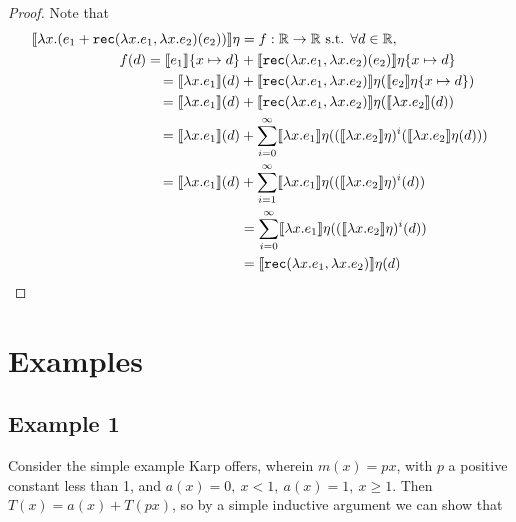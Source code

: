  \begin{proof}
 Note that
 \begin{align*}
 \llbracket \lambda x.(e_1 + \texttt{rec}(\lambda x.e_1, \lambda x.e_2)(e_2)) \rrbracket \eta
 &= f : \mathbb{R} \rightarrow \mathbb{R} \text{ s.t. } \forall d \in \mathbb{R}, \\
 f(d) =  \llbracket e_1 \rrbracket\{x\mapsto d\} &+ \llbracket \texttt{rec}(\lambda x.e_1, \lambda x.e_2)(e_2)\rrbracket\eta
 \{x\mapsto d\} \\
 = \llbracket \lambda x.e_1\rrbracket(d) &+ \llbracket\texttt{rec}(\lambda x.e_1, \lambda x.e_2)\rrbracket\eta
 (\llbracket e_2 \rrbracket\eta\{x \mapsto d\}) \\
 =  \llbracket \lambda x.e_1\rrbracket(d) &+ \llbracket\texttt{rec}(\lambda x.e_1, \lambda x.e_2)\rrbracket\eta
 (\llbracket \lambda x.e_2 \rrbracket(d)) \\
 = \llbracket \lambda x.e_1\rrbracket(d) &+ \sum_{i=0}^{\infty} \llbracket \lambda x.e_1\rrbracket\eta
 ((\llbracket \lambda x.e_2 \rrbracket\eta)^i (\llbracket \lambda x.e_2\rrbracket\eta(d))) \\
 = \llbracket \lambda x.e_1\rrbracket(d) &+ \sum_{i=1}^{\infty} \llbracket \lambda x.e_1\rrbracket\eta
 ((\llbracket \lambda x.e_2 \rrbracket\eta)^i (d)) \\
&= \sum_{i=0}^\infty \llbracket \lambda x.e_1 \rrbracket\eta ((\llbracket \lambda x.e_2\rrbracket\eta)^i(d)) \\
&=  \llbracket \texttt{rec}(\lambda x.e_1, \lambda x.e_2) \rrbracket \eta (d)
\end{align*}
\end{proof}

\section{Examples}
\subsection{Example 1}
Consider the simple example Karp offers, wherein $m(x) = px$, with $p$ a
positive constant less than 1, and $a(x) = 0, \ x < 1, \ a(x) = 1, \ x \geq 1$.
Then $T(x) = a(x) + T(px)$, so by a simple inductive argument we can show that 

